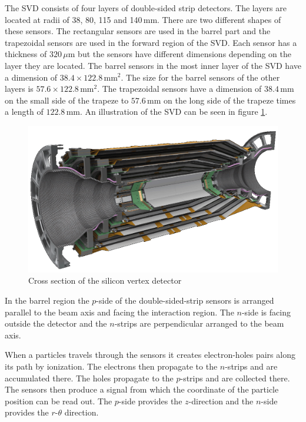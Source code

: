 \documentclass[a4paper,11pt,twosided,final,german,openbib,pdftex,listof=totoc,bibliography=totoc]{scrbook}
\begin{document}
The SVD consists of four layers of double-sided strip detectors. The layers are located at radii of 38, 80, 115 and 140$\,\textrm{mm}$. There are two different shapes of these sensors. The rectangular sensors are used in the barrel part and the trapezoidal sensors are used in the forward region of the SVD. Each sensor has a thickness of $320\,\mu\textrm{m}$ but the sensors have different dimensions depending on the layer they are located. The barrel sensors in the most inner layer of the SVD have a dimension of $38.4 \times 122.8\,\textrm{mm}^2$. The size for the barrel sensors of the other layers is $57.6 \times 122.8\,\textrm{mm}^2$. The trapezoidal sensors have a dimension of $38.4\,\textrm{mm}$ on the small side of the trapeze to $57.6\,\textrm{mm}$ on the long side of the trapeze times a length of $122.8\,\textrm{mm}$.\cite{B2TR} An illustration of the SVD can be seen in figure \ref{fig:SiliconVertex}. 

\begin{figure}[h!]
	\centering
	\includegraphics[width=\textwidth]{Bilder/SVD.png}
	\caption[Silicon Vertex Detector]{Cross section of the silicon vertex detector\cite{SVDItalian}}
	\label{fig:SiliconVertex}
\end{figure}

In the barrel region the $p$-side of the double-sided-strip sensors is arranged parallel to the beam axis and facing the interaction region. The $n$-side is facing outside the detector and the $n$-strips are perpendicular arranged to the beam axis. 

When a particles travels through the sensors it creates electron-holes pairs along its path by ionization. The electrons then propagate to the $n$-strips and are accumulated there. The holes propagate to the $p$-strips and are collected there. The sensors then produce a signal from which the coordinate of the particle position can be read out. The $p$-side provides the $z$-direction and the $n$-side provides the $r$-$\theta$ direction.\cite{B2TR} \cite{bergauer2010silicon}
\end{document}
